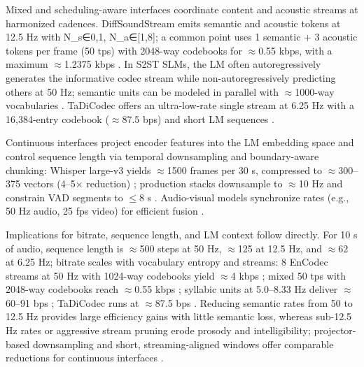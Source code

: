 \documentclass{article}
\begin{document}
Mixed and scheduling-aware interfaces coordinate content and acoustic streams at harmonized cadences. DiffSoundStream emits semantic and acoustic tokens at 12.5 Hz with N_s∈{0,1}, N_a∈[1,8]; a common point uses 1 semantic + 3 acoustic tokens per frame (50 tps) with 2048-way codebooks for $\approx$0.55 kbps, with a maximum $\approx$1.2375 kbps \cite{yang2025diffsoundstreamefficientspeechtokenizati}. In S2ST SLMs, the LM often autoregressively generates the informative codec stream while non-autoregressively predicting others at 50 Hz; semantic units can be modeled in parallel with $\approx$1000-way vocabularies \cite{peng2024mslms2stmultitaskspeechlanguagemodeltext}. TaDiCodec offers an ultra-low-rate single stream at 6.25 Hz with a 16,384-entry codebook ($\approx$87.5 bps) and short LM sequences \cite{wang2025tadicodectextawarediffusionspeechtokeniz}.

Continuous interfaces project encoder features into the LM embedding space and control sequence length via temporal downsampling and boundary-aware chunking: Whisper large-v3 yields $\approx$1500 frames per 30 s, compressed to $\approx$300--375 vectors (4--5$\times$ reduction) \cite{nguyen2025qwenvsgemmaintegrationwhispercomparative}; production stacks downsample to $\approx$10 Hz and constrain VAD segments to $\leq$8 s \cite{li2025seewossubmissionmlcslmlessonslearnedspee}. Audio-visual models synchronize rates (e.g., 50 Hz audio, 25 fps video) for efficient fusion \cite{sadok2025vectorquantizedmaskedautoencoderaudiovis}.

Implications for bitrate, sequence length, and LM context follow directly. For 10 s of audio, sequence length is $\approx$500 steps at 50 Hz, $\approx$125 at 12.5 Hz, and $\approx$62 at 6.25 Hz; bitrate scales with vocabulary entropy and streams: 8 EnCodec streams at 50 Hz with 1024-way codebooks yield $\approx$4 kbps \cite{peng2024mslms2stmultitaskspeechlanguagemodeltext}; mixed 50 tps with 2048-way codebooks reach $\approx$0.55 kbps \cite{yang2025diffsoundstreamefficientspeechtokenizati}; syllabic units at 5.0--8.33 Hz deliver $\approx$60--91 bps \cite{baade2024syllablelmlearningcoarsesemanticunitsspe}; TaDiCodec runs at $\approx$87.5 bps \cite{wang2025tadicodectextawarediffusionspeechtokeniz}. Reducing semantic rates from 50 to 12.5 Hz provides large efficiency gains with little semantic loss, whereas sub-12.5 Hz rates or aggressive stream pruning erode prosody and intelligibility; projector-based downsampling and short, streaming-aligned windows offer comparable reductions for continuous interfaces \cite{zeng2024scalingspeechtextpretrainingsyntheticint,nguyen2025qwenvsgemmaintegrationwhispercomparative,li2025seewossubmissionmlcslmlessonslearnedspee}.
\end{document}
